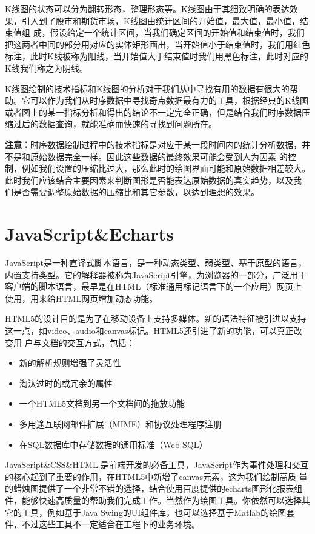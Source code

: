 K线图的状态可以分为翻转形态，整理形态等。K线图由于其细致明确的表达效果，引入到了股市和期货市场，K线图由统计区间的开始值，最大值，最小值，结束值组
成，假设给定一个统计区间，当我们确定区间的开始值和结束值时，我们把这两者中间的部分用对应的实体矩形画出，当开始值小于结束值时，我们用红色标注，此时K线被称为阳线，当开始值大于结束值时我们用黑色标注，此时对应的K线我们称之为阴线。

K线图绘制的技术指标和K线图的分析对于我们从中寻找有用的数据有很大的帮助。它可以作为我们从时序数据中寻找奇点数据最有力的工具，根据经典的K线图或者图上的某一指标分析和得出的结论不一定完全正确，但是结合我们时序数据压缩过后的数据查询，就能准确而快速的寻找到问题所在。

\textbf{注意：}时序数据绘制过程中的技术指标是对应于某一段时间内的统计分析数据，并不是和原始数据完全一样。因此这些数据的最终效果可能会受到人为因素
的控制，例如我们设置的压缩比过大，那么此时的绘图界面可能和原始数据相差较大。此时我们应该结合主要因素来判断图形是否能表达原始数据的真实趋势，以及我
们是否需要调整原始数据的压缩比和其它参数，以达到理想的效果。

\section{JavaScript\&Echarts}
\label{section 2.4}
JavaScript是一种直译式脚本语言，是一种动态类型、弱类型、基于原型的语言，内置支持类型。它的解释器被称为JavaScript引擎，为浏览器的一部分，广泛用于客户端的脚本语言，最早是在HTML（标准通用标记语言下的一个应用）网页上使用，用来给HTML网页增加动态功能。

HTML5的设计目的是为了在移动设备上支持多媒体。新的语法特征被引进以支持这一点，如video、audio和canvas标记。HTML5还引进了新的功能，可以真正改变用
户与文档的交互方式，包括：\newline
\begin{itemize}
 \setlength{\itemsep}{1pt}
 \setlength{\parskip}{0pt}
 \setlength{\parsep}{0pt}
 \item 新的解析规则增强了灵活性
 \item 淘汰过时的或冗余的属性
 \item 一个HTML5文档到另一个文档间的拖放功能
 \item 多用途互联网邮件扩展（MIME）和协议处理程序注册
 \item 在SQL数据库中存储数据的通用标准（Web SQL） 
\end{itemize}

JavaScript\&CSS\&HTML.是前端开发的必备工具，JavaScript作为事件处理和交互的核心起到了重要的作用，在HTML5中新增了canvas元素，这为我们绘制高质
量的蜡烛图提供了一个非常不错的选择，结合使用百度提供的echarts图形化报表组件，能够快速高质量的帮助我们完成工作。当然作为绘图工具。你依然可以选择其
它的工具，例如基于Java Swing的UI组件库，也可以选择基于Matlab的绘图套件，不过这些工具不一定适合在工程下的业务环境。



